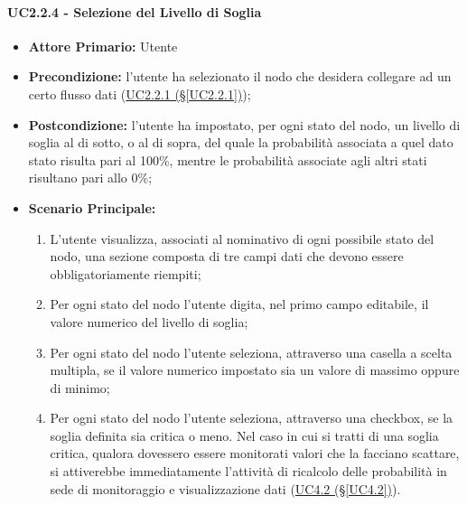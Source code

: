 \paragraph{UC2.2.4 - Selezione del Livello di Soglia}\label{UC2.2.4}
\begin{itemize}
\item \textbf{Attore Primario:} Utente
\item \textbf{Precondizione:} l'utente ha selezionato il nodo che desidera collegare ad un certo flusso dati 					(\hyperref[UC2.2.1]{UC2.2.1 (§\ref*{UC2.2.1})});
\item \textbf{Postcondizione:} l'utente ha impostato, per ogni stato del nodo, un livello di soglia al di sotto, o al di sopra,	del quale la probabilità associata a quel dato stato risulta pari al 100\%, mentre le probabilità associate agli altri stati risultano pari allo 0\%;
\item \textbf{Scenario Principale:}
	\begin{enumerate}
	\item L'utente visualizza, associati al nominativo di ogni possibile stato del nodo, una sezione composta di tre campi dati che devono essere obbligatoriamente riempiti;
	\item Per ogni stato del nodo l'utente digita, nel primo campo editabile, il valore numerico del livello di soglia;
	\item Per ogni stato del nodo l'utente seleziona, attraverso una casella a scelta multipla, se il valore numerico impostato sia un valore di massimo oppure di minimo;
	\item Per ogni stato del nodo l'utente seleziona, attraverso una checkbox, se la soglia definita sia critica o meno. Nel caso in cui si tratti di una soglia critica, qualora dovessero essere monitorati valori che la facciano scattare, si attiverebbe immediatamente l'attività di ricalcolo delle probabilità in sede di monitoraggio e visualizzazione dati (\hyperref[UC4.2]{UC4.2 (§\ref*{UC4.2})}).
	\end{enumerate}
\end{itemize}

